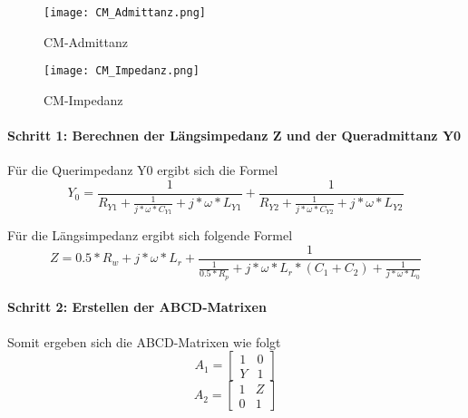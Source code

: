 \begin{figure}[H]
	\begin{minipage}[h]{0.45\linewidth}
		\centering
		\texttt{[image: CM\_Admittanz.png]}
		\label{fig:CM-Admittanz}
		\caption{CM-Admittanz}
	\end{minipage}
	\hfill
	\begin{minipage}[h]{0.45\linewidth}
	\centering
		\texttt{[image: CM\_Impedanz.png]}
		\caption{CM-Impedanz}
		\label{fig:CM-Impedanz}
	\end{minipage}
\end{figure}
\paragraph{Schritt 1: Berechnen der Längsimpedanz Z und der Queradmittanz Y0}\label{paragraph:schritt1}
Für die Querimpedanz Y0 ergibt sich die Formel
\begin{equation}\label{y_admittance}
Y_0 = \frac{ 1 }{R_{Y1} + \frac{1}{j*\omega*C_{Y1}}+j*\omega*L_{Y1}} +\frac{ 1 }{R_{Y2} + \frac{1}{j*\omega*C_{Y2}}+j*\omega*L_{Y2}}
\end{equation}

Für die Längsimpedanz ergibt sich folgende Formel
\begin{equation}\label{z_impedance}
Z = 0.5*R_w+j*\omega*L_r+\frac{ 1 }{ \frac{1}{0.5*R_p}+j*\omega*L_r*(C_1+C_2)+\frac{1}{j*\omega*L_0} }
\end{equation}

\paragraph{Schritt 2: Erstellen der ABCD-Matrixen}\label{paragraph:schritt2}

Somit ergeben sich die ABCD-Matrixen wie folgt
\begin{equation}\label{equ:abcd_a1}
A_1 =
\left[\begin{matrix}
1 & 0\\ Y&1 
\end{matrix}\right]
\end{equation}
\begin{equation}\label{equ:abcd_a2}
A_2 =
\left[\begin{matrix}
1 & Z\\ 0&1 
\end{matrix}\right]
\end{equation}

